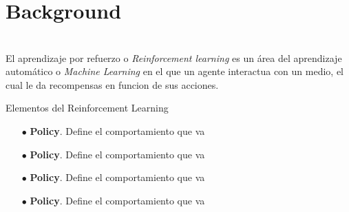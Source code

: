 \chapter{Background}


\chapter{}
El aprendizaje por refuerzo o \textit{Reinforcement learning} es un área del aprendizaje automático o \textit{Machine Learning} en el que un agente interactua con un medio, el cual le da recompensas en funcion de sus acciones.

Elementos del Reinforcement Learning \cite{sutton2018reinforcement}
\begin{itemize}
	
	
	\item[$\bullet$] \textbf{Policy}. Define el comportamiento que va 
	
	\item[$\bullet$] \textbf{Policy}. Define el comportamiento que va 
	
	\item[$\bullet$] \textbf{Policy}. Define el comportamiento que va 
	
	\item[$\bullet$] \textbf{Policy}. Define el comportamiento que va 
	
\end{itemize}